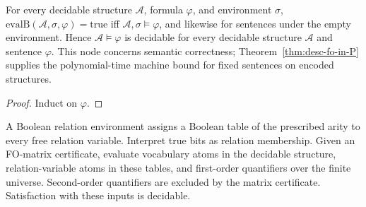 \begin{theorem}
  \label{thm:desc-model-checking}
  \leanok
  For every decidable structure $\mathcal{A}$, formula $\varphi$, and
  environment $\sigma$, $\mathrm{evalB}(\mathcal{A}, \sigma, \varphi) = \mathrm{true}$
  iff $\mathcal{A}, \sigma \models \varphi$, and likewise for sentences under the
  empty environment. Hence $\mathcal{A} \models \varphi$ is decidable for every
  decidable structure $\mathcal{A}$ and sentence $\varphi$. This node concerns
  semantic correctness; Theorem~\ref{thm:desc-fo-in-P} supplies the polynomial-time
  machine bound for fixed sentences on encoded structures.
\end{theorem}
\begin{proof}
  \leanok
  Induct on $\varphi$.
\end{proof}

\begin{definition}
  \label{def:desc-matrix-model-checking}
  \leanok
  A Boolean relation environment assigns a Boolean table of the prescribed
  arity to every free relation variable. Interpret true bits as relation
  membership. Given an FO-matrix certificate, evaluate vocabulary atoms in the
  decidable structure, relation-variable atoms in these tables, and first-order
  quantifiers over the finite universe. Second-order quantifiers are excluded
  by the matrix certificate. Satisfaction with these inputs is decidable.
\end{definition}

